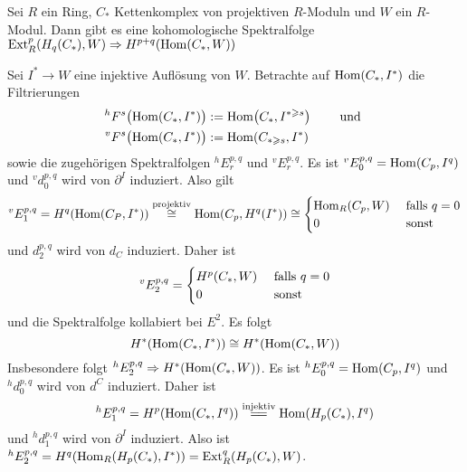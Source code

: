 \begin{satz}
	Sei $R$ ein Ring, $C_*$ Kettenkomplex von projektiven $R$-Moduln und $W$ ein $R$-Modul.
	Dann gibt es eine kohomologische Spektralfolge $\Ext_R^p \enbrace*{H_q(C_*),W} \Rightarrow H^{p+q} \enbrace*{\Hom(C_*,W)}$
\end{satz}
\begin{beweis}
	Sei $I^* \to W$ eine injektive Auflösung von $W$.
	Betrachte auf $\operatorname{Hom}(C_*,I^*)$ die Filtrierungen 
	\begin{align}
		^h F^s \enbrace[\big]{\Hom(C_*,I^*)} &:= \Hom \enbrace*{C_*, I^{*\ge s}} \qquad \text{ und } \\
		^v F^s \enbrace[\big]{\Hom(C_*,I^*)} &:= \Hom \enbrace*{C_{*\ge s}, I^*}
	\end{align}
	sowie die zugehörigen Spektralfolgen $^h E^{p,q}_r$ und $^v E^{p,q}_r$.
	Es ist $^v E^{p,q}_0 = \Hom \enbrace*{C_p,I^q}$ und $^v d_0^{p,q}$ wird von $\partial^I$ induziert.
	Also gilt 
	\[
		^v E^{p,q}_1 = H^q \enbrace*{\Hom(C_P, I^*)} \StackText{projektiv}{\cong}\Hom \enbrace*{C_p, H^q(I^*)} \cong \begin{cases}
			\Hom_R(C_p,W) &\text{ falls }q=0\\
			0 &\text{ sonst}
		\end{cases}
	\]
	und $d_2^{p,q}$ wird von $d_C$ induziert.
	Daher ist 
	\[
		^v E^{p,q}_2 = \begin{cases}
			H^p \enbrace*{C_*,W} &\text{ falls }q=0\\
			0 &\text{ sonst}
		\end{cases}
	\]
	und die Spektralfolge kollabiert bei $E^2$.
	Es folgt 
	\[
		H^* \enbrace*{\Hom(C_*,I^*)} \cong H^* \enbrace*{\Hom(C_*,W)}
	\]
	Insbesondere folgt $^h E^{p,q}_2 \Rightarrow H^* \enbrace*{\Hom(C_*,W)}$.
	Es ist $^h E^{p,q}_0 = \Hom \enbrace*{C_p,I^q}$ und $^h d^{p,q}_0$ wird von $d^C$ induziert.
	Daher ist 
	\[
		^h E^{p,q}_1 = H^p \enbrace*{\Hom(C_*,I^q)} \StackText{injektiv}{=\joinrel=} \Hom \enbrace*{H_p(C_*),I^q}
	\]
	und $^h d_1^{p,q}$ wird von $\partial^I$ induziert.
	Also ist $^h E^{p,q}_2 = H^q \enbrace*{\Hom_R \enbrace*{H_p(C_*),I^*}} = \Ext_R^q \enbrace*{H_p(C_*),W}$.
\end{beweis}

